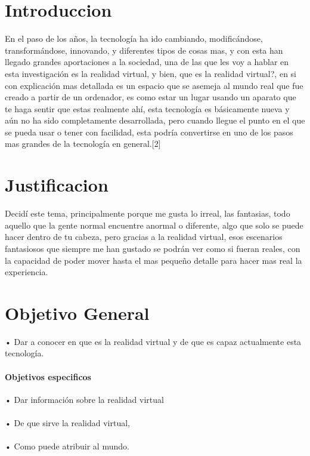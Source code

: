 \documentclass{bmcart}
\begin{document}

\section*{Introduccion}
En el paso de los años, la tecnología ha ido cambiando, modificándose, transformándose, innovando, y diferentes tipos de cosas mas, y con esta han llegado grandes aportaciones a la sociedad, una de las que les voy a hablar en esta investigación es la realidad virtual, y bien, que es la realidad virtual?, en si con explicación mas detallada es un espacio que se asemeja al mundo real que fue creado a partir de un ordenador, es como estar un lugar usando un aparato que te haga sentir que estas realmente ahí, esta tecnología es básicamente nueva y aún no ha sido completamente desarrollada, pero cuando llegue el punto en el que se pueda usar o tener con facilidad, esta podría convertirse en uno de los pasos mas grandes de la tecnología en general.[2] %

\section*{Justificacion}
Decidí este tema, principalmente porque me gusta lo irreal, las fantasias, todo aquello que la gente normal encuentre anormal o diferente, algo que solo se puede hacer dentro de tu cabeza, pero gracias a la realidad virtual, esos escenarios fantasiosos que siempre me han gustado se podrán ver como si fueran reales, con la capacidad de poder mover hasta el mas pequeño detalle para hacer mas real la experiencia. 
\section*{Objetivo General}
•	Dar a conocer en que es la realidad virtual y de que es capaz actualmente esta tecnología.
\paragraph{Objetivos especificos}
•	Dar información sobre la realidad virtual
\paragraph{}
•	De que sirve la realidad virtual,
\paragraph{}
•	Como puede atribuir al mundo.
\end{document}

